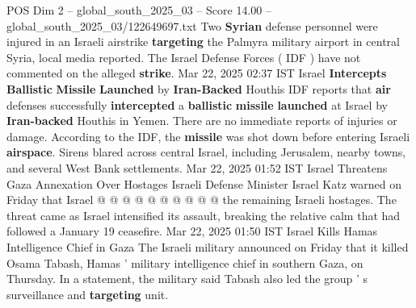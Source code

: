\begin{textsample}{POS Dim 2 – global\_south\_2025\_03 – Score 14.00 – global\_south\_2025\_03/122649697.txt}
Two \textbf{Syrian} defense personnel were injured in an Israeli airstrike \textbf{targeting} the Palmyra military airport in central Syria, local media reported.
The Israel Defense Forces ( IDF ) have not commented on the alleged \textbf{strike}.
Mar 22, 2025 02:37 IST Israel \textbf{Intercepts} \textbf{Ballistic} \textbf{Missile} \textbf{Launched} by \textbf{Iran-Backed} Houthis IDF reports that \textbf{air} defenses successfully \textbf{intercepted} a \textbf{ballistic} \textbf{missile} \textbf{launched} at Israel by \textbf{Iran-backed} Houthis in Yemen.
There are no immediate reports of injuries or damage.
According to the IDF, the \textbf{missile} was shot down before entering Israeli \textbf{airspace}.
Sirens blared across central Israel, including Jerusalem, nearby towns, and several West Bank settlements.
Mar 22, 2025 01:52 IST Israel Threatens Gaza Annexation Over Hostages Israeli Defense Minister Israel Katz warned on Friday that Israel @ @ @ @ @ @ @ @ @ @ the remaining Israeli hostages.
The threat came as Israel intensified its assault, breaking the relative calm that had followed a January 19 ceasefire.
Mar 22, 2025 01:50 IST Israel Kills Hamas Intelligence Chief in Gaza The Israeli military announced on Friday that it killed Osama Tabash, Hamas ' military intelligence chief in southern Gaza, on Thursday.
In a statement, the military said Tabash also led the group ' s surveillance and \textbf{targeting} unit.

\end{textsample}
